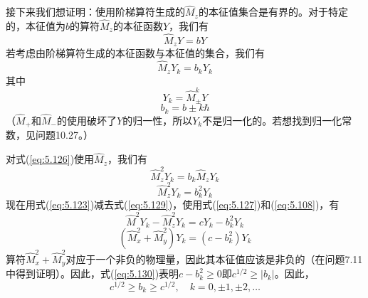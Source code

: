     接下来我们想证明：使用阶梯算符生成的$\hat{M}_z$的本征值集合是有界的。对于特定的，本征值为$b$的算符$\hat{M}_z$的本征函数$Y$，我们有
    \begin{equation*}
        \hat{M}_zY = bY
    \end{equation*}
    若考虑由阶梯算符生成的本征函数与本征值的集合，我们有
    \begin{equation}
        \hat{M}_zY_k = b_kY_k
        \label{eq:5.126}
    \end{equation}
    其中
    \begin{equation}
        Y_k = \hat{M}_{\pm}^kY
        \label{eq:5.127}
    \end{equation}
    \begin{equation}
        b_k = b \pm k\hbar
        \label{eq:5.128}
    \end{equation}
    （$\hat{M}_+$和$\hat{M}_-$的使用破坏了$Y$的归一性，所以$Y_k$不是归一化的。若想找到归一化常数，见问题10.27。）

    对式(\ref{eq:5.126})使用$\hat{M}_z$，我们有
    \begin{equation*}
        \hat{M}_z^2Y_k = b_k\hat{M}_zY_k
    \end{equation*}
    \begin{equation}
        \hat{M}_z^2Y_k = b_k^2Y_k
        \label{eq:5.129}
    \end{equation}
    现在用式(\ref{eq:5.123})减去式(\ref{eq:5.129})，使用式(\ref{eq:5.127})和(\ref{eq:5.108})，有
    \begin{equation*}
        \hat{M}^2Y_k - \hat{M}_z^2Y_k = cY_k - b_k^2Y_k
    \end{equation*}
    \begin{equation}
        \left(\hat{M}_x^2+\hat{M}_y^2\right)Y_k = \left(c - b_k^2\right)Y_k
        \label{eq:5.130}
    \end{equation}
    算符$\hat{M}_x^2+\hat{M}_y^2$对应于一个非负的物理量，因此其本征值应该是非负的（在问题7.11中得到证明）。因此，式(\ref{eq:5.130})表明$c-b_k^2 \ge 0$即$c^{1/2} \ge \left|b_k\right|$。因此，
    \begin{equation}
        c^{1/2} \ge b_k \ge c^{1/2}, \quad k = 0, \pm 1, \pm 2, \ldots
        \label{eq:5.131}
    \end{equation}


